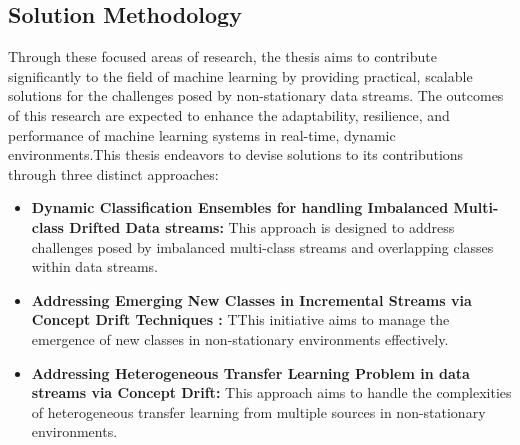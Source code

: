 \subsection{Solution Methodology}
Through these focused areas of research, the thesis aims to contribute significantly to the field of machine learning by providing practical, scalable solutions for the challenges posed by non-stationary data streams. The outcomes of this research are expected to enhance the adaptability, resilience, and performance of machine learning systems in real-time, dynamic environments.This thesis endeavors to devise solutions to its contributions through three distinct approaches:
\begin{itemize}
    \item \textbf{Dynamic Classification Ensembles for handling Imbalanced Multi-class Drifted Data streams:} This approach is designed to address challenges posed by imbalanced multi-class streams and overlapping classes within data streams.
    \item \textbf{Addressing Emerging New Classes in Incremental Streams via Concept Drift Techniques :} TThis initiative aims to manage the emergence of new classes in non-stationary environments effectively.
    \item \textbf{Addressing Heterogeneous Transfer Learning Problem in data streams via Concept Drift:} This approach aims to handle the complexities of heterogeneous transfer learning from multiple sources in non-stationary environments.
\end{itemize}
